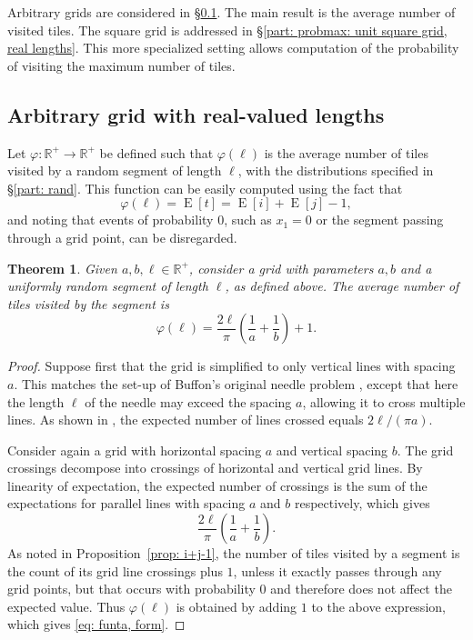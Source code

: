 \documentclass[12pt, a4paper]{article}
\DeclareMathOperator{\E}{E}
\newcommand{\funta}{\varphi} %
\newcommand{\len}{\ell} %
\newcommand{\tiles}{t} %
\newtheorem{theorem}{Theorem}%
\begin{document}
Arbitrary grids are considered in \S\ref{part: probmax: arbitrary grid, real lengths}. The main result is the average number of visited tiles. The square grid is addressed in \S\ref{part: probmax: unit square grid, real lengths}. This more specialized setting allows computation of the probability of visiting the maximum number of tiles.


\subsection{Arbitrary grid with real-valued lengths}
\label{part: probmax: arbitrary grid, real lengths}

Let $\funta: \mathbb R^+ \to \mathbb R^+$ be defined such that $\funta(\len)$ is the average number of tiles visited by a random segment of length $\len$, with the distributions specified in \S\ref{part: rand}. This function can be easily computed using the fact that
\begin{equation}
\label{eq: funta E[i] E[j]}
\funta(\len) = \E[\tiles] = \E[i]+\E[j]-1,
\end{equation}
and noting that events of probability $0$, such as $x_1=0$ or the segment passing through a grid point, can be disregarded.

\begin{theorem}
\label{theo: funta, form}
Given $a, b, \len \in \mathbb R^+$, consider a grid with parameters $a, b$ and a uniformly random segment of length $\len$, as defined above. The average number of tiles visited by the segment is 
\begin{equation}
\label{eq: funta, form}
\funta(\len) = \frac{2\len}{\pi}\left(\frac 1 a + \frac 1 b\right) + 1.
\end{equation}
\end{theorem}

\begin{proof}
Suppose first that the grid is simplified to only vertical lines with spacing $a$. This matches the set-up of Buffon's original needle problem \cite[section 1.1]{Mathai99}, except that here the length $\len$ of the needle may exceed the spacing $a$, allowing it to cross multiple lines. As shown in \cite{Ramaley69}, the expected number of lines crossed equals $2\len/(\pi a)$.

Consider again a grid with horizontal spacing $a$ and vertical spacing $b$. The grid crossings decompose into crossings of horizontal and vertical grid lines. By linearity of expectation, the expected number of crossings is the sum of the expectations for parallel lines with spacing $a$ and $b$ respectively, which gives
\[
\frac{2\len}{\pi}\left(\frac 1 a + \frac 1 b\right).
\]
As noted in Proposition~\ref{prop: i+j-1}, the number of tiles visited by a segment is the count of its grid line crossings plus $1$, unless it exactly passes through any grid points, but that occurs with probability $0$ and therefore does not affect the expected value. Thus $\funta(\len)$ is obtained by adding $1$ to the above expression, which gives \eqref{eq: funta, form}.
\end{proof}
\end{document}
